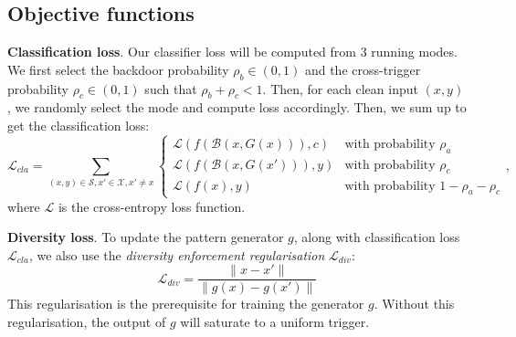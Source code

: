\subsection{Objective functions}
{\bfseries Classification loss}. Our classifier loss will be computed from 3 running modes. We first select the backdoor probability $\rho_b \in (0, 1)$ and the cross-trigger probability $\rho_c \in (0, 1)$ such that  $\rho_b + \rho_c < 1$. Then, for each clean input $(x, y)$, we randomly select the mode and compute loss accordingly. Then, we sum up to get the classification loss:
\begin{equation}
\mathcal{L}_{cla}=\sum_{(x,y)\in\mathcal{S}, x'\in\mathcal{X}, x' \neq x}\begin{cases}
\mathcal{L}(f(\mathcal{B}(x,G(x))),c) & \text{with probability } \rho_a\\
\mathcal{L}(f(\mathcal{B}(x,G(x'))),y) &\text{with probability } \rho_c\\
\mathcal{L}(f(x),y) &\text{with probability } 1-\rho_a-\rho_c\end{cases},
\end{equation}
where $\mathcal{L}$ is the cross-entropy loss function.

{\bfseries Diversity loss}. To update the pattern generator $g$, along with classification loss $\mathcal{L}_{cla}$, we also use the {\itshape diversity enforcement regularisation} $\mathcal{L}_{div}$:
\begin{equation*}
    \mathcal{L}_{div} = \frac{\|x-x'\|}{\|g(x)-g(x')\|}
\end{equation*}
This regularisation is the prerequisite for training the generator $g$. Without this regularisation, the output of $g$ will saturate to a uniform trigger.

